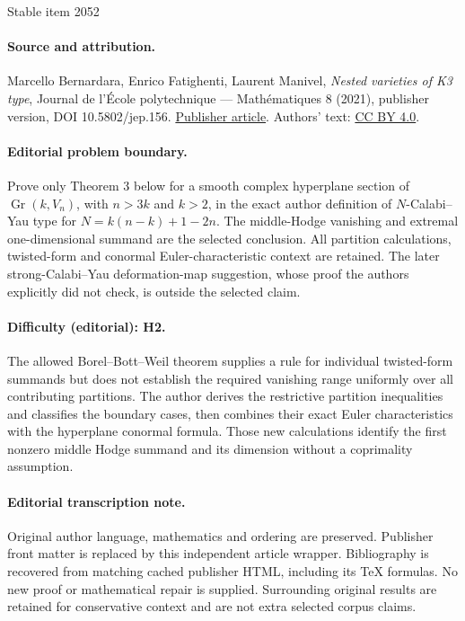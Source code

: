 \documentclass[11pt]{article}
\theoremstyle{plain}
\theoremstyle{definition}
\DeclareMathOperator{\Gr}{Gr}
\begin{document}
\begin{center}{\Large Stable item 2052}\end{center}
\paragraph{Source and attribution.}
Marcello Bernardara, Enrico Fatighenti, Laurent Manivel, \emph{Nested varieties of K3 type}, Journal de l’École polytechnique — Mathématiques 8 (2021), publisher version, DOI 10.5802/jep.156. \href{https://jep.centre-mersenne.org/articles/10.5802/jep.156/}{Publisher article}. Authors' text: \href{https://creativecommons.org/licenses/by/4.0/}{CC BY 4.0}.
\paragraph{Editorial problem boundary.}
Prove only Theorem 3 below for a smooth complex hyperplane section of \(\Gr(k,V_n)\), with \(n>3k\) and \(k>2\), in the exact author definition of \(N\)-Calabi--Yau type for \(N=k(n-k)+1-2n\). The middle-Hodge vanishing and extremal one-dimensional summand are the selected conclusion. All partition calculations, twisted-form and conormal Euler-characteristic context are retained. The later strong-Calabi--Yau deformation-map suggestion, whose proof the authors explicitly did not check, is outside the selected claim.
\paragraph{Difficulty (editorial): H2.}
The allowed Borel--Bott--Weil theorem supplies a rule for individual twisted-form summands but does not establish the required vanishing range uniformly over all contributing partitions. The author derives the restrictive partition inequalities and classifies the boundary cases, then combines their exact Euler characteristics with the hyperplane conormal formula. Those new calculations identify the first nonzero middle Hodge summand and its dimension without a coprimality assumption.
\paragraph{Editorial transcription note.}
Original author language, mathematics and ordering are preserved. Publisher front matter is replaced by this independent article wrapper. Bibliography is recovered from matching cached publisher HTML, including its TeX formulas. No new proof or mathematical repair is supplied. Surrounding original results are retained for conservative context and are not extra selected corpus claims.
\clearpage
\end{document}
